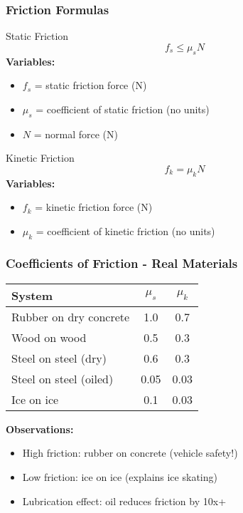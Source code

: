 \documentclass{beamer}
\begin{document}
\begin{frame}
\frametitle{Friction Formulas}
\begin{block}{Static Friction}
\[ f_s \leq \mu_s N \]
\textbf{Variables:}
\begin{itemize}
    \item $f_s$ = static friction force (N)
    \item $\mu_s$ = coefficient of static friction (no units)
    \item $N$ = normal force (N)
\end{itemize}
\end{block}
\pause

\begin{block}{Kinetic Friction}
\[ f_k = \mu_k N \]
\textbf{Variables:}
\begin{itemize}
    \item $f_k$ = kinetic friction force (N)
    \item $\mu_k$ = coefficient of kinetic friction (no units)
\end{itemize}
\end{block}
\end{frame}

\begin{frame}
\frametitle{Coefficients of Friction - Real Materials}
\begin{table}
\centering
\begin{tabular}{|l|c|c|}
\hline
\textbf{System} & $\mu_s$ & $\mu_k$ \\
\hline
Rubber on dry concrete & 1.0 & 0.7 \\
Wood on wood & 0.5 & 0.3 \\
Steel on steel (dry) & 0.6 & 0.3 \\
Steel on steel (oiled) & 0.05 & 0.03 \\
Ice on ice & 0.1 & 0.03 \\
\hline
\end{tabular}
\end{table}

\pause
\vspace{0.5em}
\textbf{Observations:}
\begin{itemize}
    \item High friction: rubber on concrete (vehicle safety!)
    \pause
    \item Low friction: ice on ice (explains ice skating)
    \pause
    \item Lubrication effect: oil reduces friction by 10x+
\end{itemize}
\end{frame}
\end{document}
